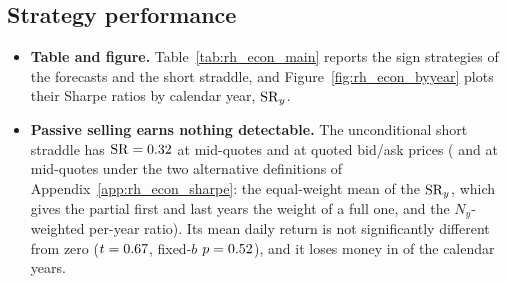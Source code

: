 \subsection{Strategy performance}
\label{sec:rh_econ_results}
\begin{itemize}
\item \textbf{Table and figure.} Table~\ref{tab:rh_econ_main} reports the sign strategies of the \rhrPoolN{}
  forecasts and the short straddle, and Figure~\ref{fig:rh_econ_byyear} plots their Sharpe ratios by calendar year,
  $\mathrm{SR}_y$.
\item \textbf{Passive selling earns nothing detectable.} The unconditional short straddle has $\mathrm{SR} = 0.32$ at
  mid-quotes and \rheShortShX{} at quoted bid/ask prices (\rhemShDSixShort{} and \rhemShDOneShort{} at mid-quotes
  under the two alternative definitions of Appendix~\ref{app:rh_econ_sharpe}: the equal-weight mean of the $\mathrm{SR}_y$,
  which gives the partial first and last years the weight of a full one, and the $N_y$-weighted per-year ratio). Its
  mean daily return is not significantly different from zero ($t = 0.67$, fixed-$b$ $p = 0.52$), and it
  loses money in \rheShortLossYears{} of the \rheNYears{} calendar years.

\end{itemize}
